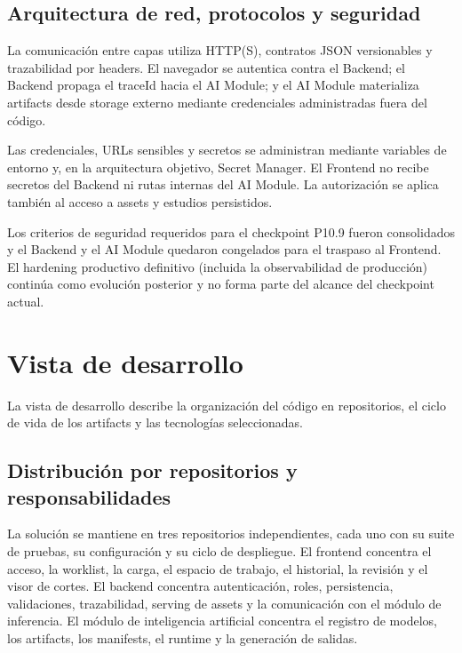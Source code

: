 \subsection{Arquitectura de red, protocolos y seguridad}

La comunicación entre capas utiliza HTTP(S), contratos JSON versionables y trazabilidad por headers. El navegador se autentica contra el Backend; el Backend propaga el traceId hacia el AI Module; y el AI Module materializa artifacts desde storage externo mediante credenciales administradas fuera del código.


Las credenciales, URLs sensibles y secretos se administran mediante variables de entorno y, en la arquitectura objetivo, Secret Manager. El Frontend no recibe secretos del Backend ni rutas internas del AI Module. La autorización se aplica también al acceso a assets y estudios persistidos.

Los criterios de seguridad requeridos para el checkpoint P10.9 fueron consolidados y el Backend y el AI Module quedaron congelados para el traspaso al Frontend. El hardening productivo definitivo (incluida la observabilidad de producción) continúa como evolución posterior y no forma parte del alcance del checkpoint actual.

\section{Vista de desarrollo}

La vista de desarrollo describe la organización del código en repositorios, el ciclo de vida de los artifacts y las tecnologías seleccionadas.

\subsection{Distribución por repositorios y responsabilidades}

La solución se mantiene en tres repositorios independientes, cada uno con su suite de pruebas, su configuración y su ciclo de despliegue. El frontend concentra el acceso, la worklist, la carga, el espacio de trabajo, el historial, la revisión y el visor de cortes. El backend concentra autenticación, roles, persistencia, validaciones, trazabilidad, serving de assets y la comunicación con el módulo de inferencia. El módulo de inteligencia artificial concentra el registro de modelos, los artifacts, los manifests, el runtime y la generación de salidas.

